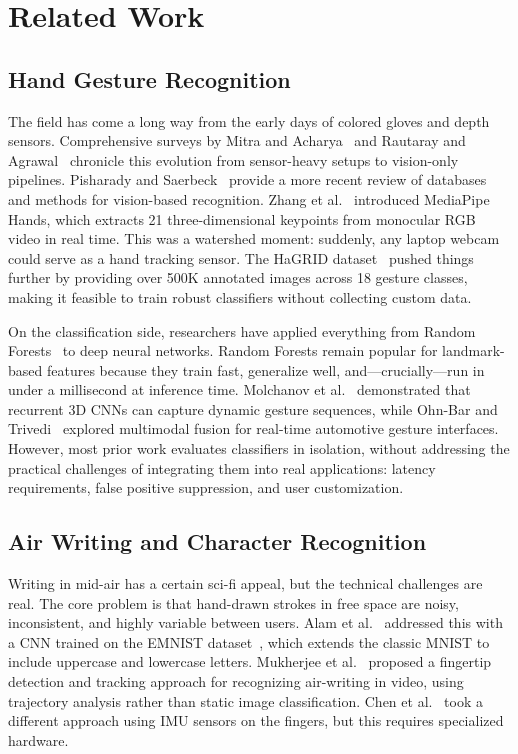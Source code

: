 \documentclass[conference]{IEEEtran}
\begin{document}
\section{Related Work}

\subsection{Hand Gesture Recognition}

The field has come a long way from the early days of colored gloves and depth sensors. Comprehensive surveys by Mitra and Acharya~\cite{mitra2007} and Rautaray and Agrawal~\cite{rautaray2015} chronicle this evolution from sensor-heavy setups to vision-only pipelines. Pisharady and Saerbeck~\cite{pisharady2015} provide a more recent review of databases and methods for vision-based recognition. Zhang et al.~\cite{mediapipe2019} introduced MediaPipe Hands, which extracts 21 three-dimensional keypoints from monocular RGB video in real time. This was a watershed moment: suddenly, any laptop webcam could serve as a hand tracking sensor. The HaGRID dataset~\cite{hagrid2022} pushed things further by providing over 500K annotated images across 18 gesture classes, making it feasible to train robust classifiers without collecting custom data.

On the classification side, researchers have applied everything from Random Forests~\cite{breiman2001} to deep neural networks. Random Forests remain popular for landmark-based features because they train fast, generalize well, and---crucially---run in under a millisecond at inference time. Molchanov et al.~\cite{molchanov2016} demonstrated that recurrent 3D CNNs can capture dynamic gesture sequences, while Ohn-Bar and Trivedi~\cite{ohnbar2013} explored multimodal fusion for real-time automotive gesture interfaces. However, most prior work evaluates classifiers in isolation, without addressing the practical challenges of integrating them into real applications: latency requirements, false positive suppression, and user customization.

\subsection{Air Writing and Character Recognition}

Writing in mid-air has a certain sci-fi appeal, but the technical challenges are real. The core problem is that hand-drawn strokes in free space are noisy, inconsistent, and highly variable between users. Alam et al.~\cite{alam2020} addressed this with a CNN trained on the EMNIST dataset~\cite{cohen2017}, which extends the classic MNIST to include uppercase and lowercase letters. Mukherjee et al.~\cite{mukherjee2019} proposed a fingertip detection and tracking approach for recognizing air-writing in video, using trajectory analysis rather than static image classification. Chen et al.~\cite{chen2019} took a different approach using IMU sensors on the fingers, but this requires specialized hardware.
\end{document}
